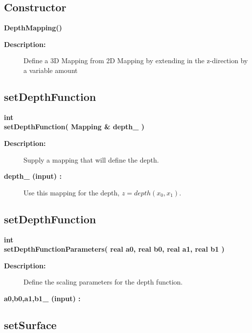 \subsection{Constructor}
 
\newlength{\DepthMappingIncludeArgIndent}
\begin{flushleft} \textbf{%
\settowidth{\DepthMappingIncludeArgIndent}{DepthMapping(}%
DepthMapping() 
}\end{flushleft}
\begin{description}
\item[{\bf Description:}]  
  Define a 3D Mapping from 2D Mapping by extending in 
  the z-direction by a variable amount

\end{description}
\subsection{setDepthFunction}
 
\begin{flushleft} \textbf{%
int  \\ 
\settowidth{\DepthMappingIncludeArgIndent}{setDepthFunction(}%
setDepthFunction( Mapping \& depth\_ )
}\end{flushleft}
\begin{description}
\item[{\bf Description:}] 
    Supply a mapping that will define the depth.
\item[{\bf depth\_ (input) :}]  Use this mapping for the depth, $z=depth(x_0,x_1)$.
\end{description}
\subsection{setDepthFunction}
 
\begin{flushleft} \textbf{%
int  \\ 
\settowidth{\DepthMappingIncludeArgIndent}{setDepthFunctionParameters(}%
setDepthFunctionParameters( real a0, real b0, real a1, real b1 )
}\end{flushleft}
\begin{description}
\item[{\bf Description:}] 
    Define the scaling parameters for the depth function.
\item[{\bf a0,b0,a1,b1\_ (input) :}]  
\end{description}
\subsection{setSurface}
 

